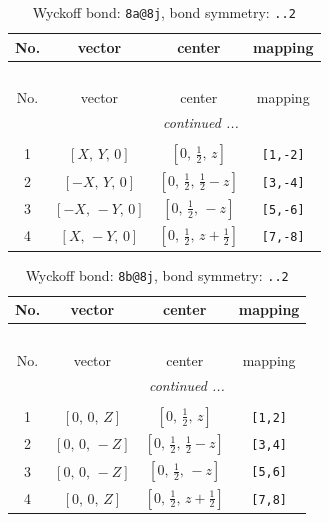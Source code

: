 \documentclass[fleqn,8pt]{jsarticle}
\begin{document}
\begin{longtable}{cccc}
\caption{Wyckoff bond: {\tt 8a@8j}, bond symmetry: {\tt ..2}}
 \\
 \hline \hline
No. & vector & center & mapping \\ \hline \endfirsthead

\multicolumn{3}{l}{\tablename\ \thetable{}} \\
 \hline \hline
No. & vector & center & mapping \\ \hline \endhead

 \hline \hline
\multicolumn{3}{r}{\footnotesize\it continued ...} \\ \endfoot

 \hline \hline
\multicolumn{3}{r}{} \\ \endlastfoot

1 & $\left[ X,\, Y,\, 0 \right]$ & $\left[ 0,\, \frac{1}{2},\, z \right]$ & {\tt [1,-2]} \\ \hline
2 & $\left[ - X,\, Y,\, 0 \right]$ & $\left[ 0,\, \frac{1}{2},\, \frac{1}{2} - z \right]$ & {\tt [3,-4]} \\ \hline
3 & $\left[ - X,\, - Y,\, 0 \right]$ & $\left[ 0,\, \frac{1}{2},\, - z \right]$ & {\tt [5,-6]} \\ \hline
4 & $\left[ X,\, - Y,\, 0 \right]$ & $\left[ 0,\, \frac{1}{2},\, z + \frac{1}{2} \right]$ & {\tt [7,-8]} \\
\end{longtable}
\renewcommand{\arraystretch}{1.2}
\begin{longtable}{cccc}
\caption{Wyckoff bond: {\tt 8b@8j}, bond symmetry: {\tt ..2}}
 \\
 \hline \hline
No. & vector & center & mapping \\ \hline \endfirsthead

\multicolumn{3}{l}{\tablename\ \thetable{}} \\
 \hline \hline
No. & vector & center & mapping \\ \hline \endhead

 \hline \hline
\multicolumn{3}{r}{\footnotesize\it continued ...} \\ \endfoot

 \hline \hline
\multicolumn{3}{r}{} \\ \endlastfoot

1 & $\left[ 0,\, 0,\, Z \right]$ & $\left[ 0,\, \frac{1}{2},\, z \right]$ & {\tt [1,2]} \\ \hline
2 & $\left[ 0,\, 0,\, - Z \right]$ & $\left[ 0,\, \frac{1}{2},\, \frac{1}{2} - z \right]$ & {\tt [3,4]} \\ \hline
3 & $\left[ 0,\, 0,\, - Z \right]$ & $\left[ 0,\, \frac{1}{2},\, - z \right]$ & {\tt [5,6]} \\ \hline
4 & $\left[ 0,\, 0,\, Z \right]$ & $\left[ 0,\, \frac{1}{2},\, z + \frac{1}{2} \right]$ & {\tt [7,8]} \\
\end{longtable}
\end{document}
